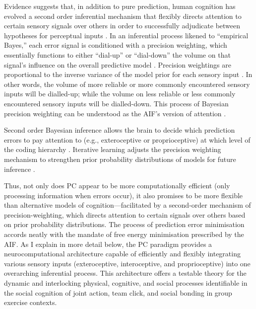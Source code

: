 \begin{CJK}{UTF8}{gbsn}
Evidence suggests that, in addition to pure prediction, human cognition has evolved a second order inferential mechanism that flexibly directs attention to certain sensory signals over others in order to successfully adjudicate between hypotheses for perceptual inputs \citep{Clark2013}.  In an inferential process likened to ``empirical Bayes,'' each error signal is conditioned with a precision weighting, which essentially functions to either ``dial-up'' or ``dial-down'' the volume on that signal's influence on the overall predictive model \citep{Clark2015}.  Precision weightings are proportional to the inverse variance of the model prior for each sensory input \citep{Ernst2004,FitzGerald2014}.  In other words, the volume of more reliable or more commonly encountered sensory inputs will be dialled-up; while the volume on less reliable or less commonly encountered sensory inputs will be dialled-down. This process of Bayesian precision weighting can be understood as the AIF's version of attention \citep{Ramstead2016}.

Second order Bayesian inference allows the brain to decide which prediction errors to pay attention to (e.g., exteroceptive or proprioceptive) at which level of the coding hierarchy \citep[for example, high and conceptual or deep and sensory][]{Friston2015}.  Iterative learning adjusts the precision weighting mechanism to strengthen prior probability distributions of models for future inference \citep{Robbins1964}.

Thus, not only does PC appear to be more computationally efficient (only processing information when errors occur), it also promises to be more flexible than alternative models of cognition---facilitated by a second-order mechanism of precision-weighting, which directs attention to certain signals over others based on prior probability distributions.  The process of prediction error minimisation accords neatly with the mandate of free energy minimisation prescribed by the AIF.  As I explain in more detail below, the PC paradigm provides a neurocomputational architecture capable of efficiently and flexibly integrating various sensory inputs (exteroceptive, interoceptive, and proprioceptive) into one overarching inferential process.  This architecture offers a testable theory for the dynamic and interlocking physical, cognitive, and social processes identifiable in the social cognition of joint action, team click, and social bonding in group exercise contexts.



\end{CJK}

